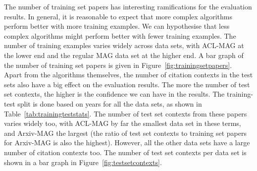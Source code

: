 The number of training set papers has interesting ramifications for the evaluation results. In general, it is reasonable to expect that more complex algorithms perform better with more training examples. We can hypothesise that less complex algorithms might perform better with fewer training examples. The number of training examples varies widely across data sets, with ACL-MAG at the lower end and the regular MAG data set at the higher end. A bar graph of the number of training set papers is given in Figure~\ref{fig:trainingsetpapers}.\\
Apart from the algorithms themselves, the number of citation contexts in the test sets also have a big effect on the evaluation results. The more the number of test set contexts, the higher is the confidence we can have in the results. The training-test split is done based on years for all the data sets, as shown in Table~\ref{tab:trainingteststats}. The number of test set contexts from these papers varies widely too, with ACL-MAG by far the smallest data set in these terms, and Arxiv-MAG the largest (the ratio of test set contexts to training set papers for Arxiv-MAG is also the highest). However, all the other data sets have a large number of citation contexts too. The number of test set contexts per data set is shown in a bar graph in Figure~\ref{fig:testsetcontexts}. 

